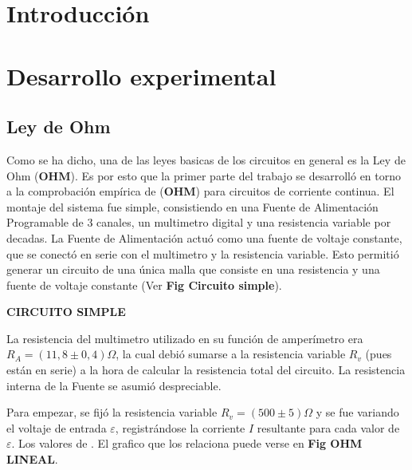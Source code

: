 \documentclass[11pt,a4paper]{article}
\begin{document}
\section{Introducción}\label{sec:intro}
	


\section{Desarrollo experimental}

\subsection{Ley de Ohm}

Como se ha dicho, una de las leyes basicas de los circuitos en general es la Ley de Ohm (\textbf{OHM}). Es por esto que la primer parte del trabajo se desarrolló en torno a la comprobación empírica de (\textbf{OHM}) para circuitos de corriente continua. El montaje del sistema fue simple, consistiendo en una Fuente de Alimentación Programable de 3 canales, un multimetro digital y una resistencia variable por decadas. La Fuente de Alimentación actuó como una fuente de voltaje constante, que se conectó en serie con el multimetro y la resistencia variable. Esto permitió generar un circuito de una única malla que consiste en una resistencia y una fuente de voltaje constante (Ver \textbf{Fig Circuito simple}). 

\textbf{CIRCUITO SIMPLE}

La resistencia del multimetro utilizado en su función de amperímetro era $R_{A} = (11,8 \pm 0,4) \Omega$, la cual debió sumarse a la resistencia variable $R_v$ (pues están en serie) a la hora de calcular la resistencia total del circuito. La resistencia interna de la Fuente se asumió despreciable.

Para empezar, se fijó la resistencia variable $R_v = (500 \pm 5)\Omega$ y se fue variando el voltaje de entrada $\varepsilon$, registrándose la corriente $I$ resultante para cada valor de $\varepsilon$. Los valores de . El grafico que los relaciona puede verse en \textbf{Fig OHM LINEAL}.
\end{document}
